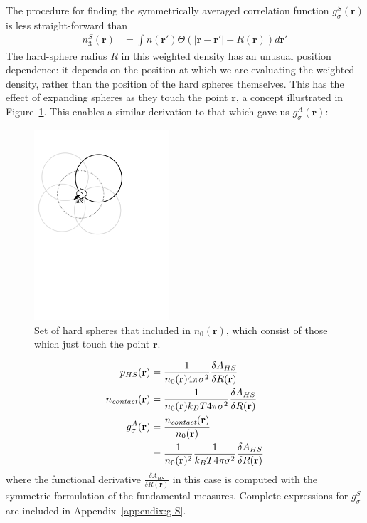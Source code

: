\documentclass[letterpaper,twocolumn,amsmath,amssymb,jcp,10pt,aip]{revtex4-1}
\newcommand{\rr}{\textbf{r}}
\begin{document}
The procedure for finding the symmetrically averaged correlation
function $g_\sigma^S(\rr)$ is less straight-forward than 
\begin{align}
  n_3^S(\rr) &= \int n(\rr')\Theta(|\rr-\rr'|-R(\rr))d\rr'
\end{align}
The hard-sphere radius $R$ in this weighted density has an unusual
position dependence:  it depends on the position at which we are
evaluating the weighted density, rather than the position of the hard
spheres themselves.  This has the effect of expanding spheres as they
touch the point $\rr$, a concept illustrated in
Figure~\ref{fig:contact}.  This enables a similar derivation to that
which gave us $g_\sigma^A(\rr)$:
\begin{figure}
\includegraphics[width=5cm]{figs/contact}
\caption{Set of hard spheres that included in $n_0(\mathbf{r})$, which
  consist of those which just touch the point $\mathbf{r}$.}
\label{fig:contact}
\end{figure}
\begin{align}
  p_{HS}(\mathbf{r}) &= \frac{1}{n_0(\rr) 4\pi \sigma^2} \frac{\delta
    A_{HS}}{\delta R(\mathbf{r})} \label{eq:p_{HS}^S}\\
  \ncontact(\rr) &= \frac{1}{n_0(\rr) k_BT 4\pi \sigma^2} \frac{\delta
    A_{HS}}{\delta R(\mathbf{r})} \\
  g_\sigma^A(\rr) &= \frac{\ncontact(\rr)}{n_0(\rr)} \\
  &= \frac{1}{n_0(\rr)^2}\frac{1}{ k_BT 4\pi \sigma^2} \frac{\delta
    A_{HS}}{\delta R(\mathbf{r})} \label{eq:g-A-exact}
\end{align}
where the functional derivative $\frac{\delta A_{HS}}{\delta
  R(\mathbf{r})}$ in this case is computed with the symmetric
formulation of the fundamental measures.  Complete expressions for
$g_\sigma^S$ are included in Appendix~\ref{appendix:g-S}.\\
\end{document}
